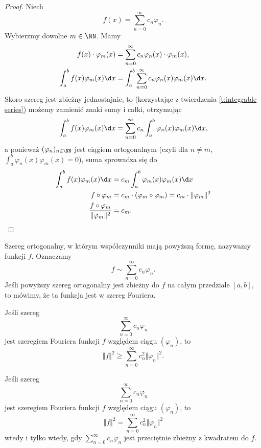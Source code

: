 \begin{proof}
    Niech
    \[ f(x) = \sum_{n=0}^\infty c_n\varphi_n. \]
    Wybierzmy dowolne $m \in \NN$. Mamy
    \begin{align*}
        f(x) \cdot \varphi_m (x)
        &= \sum_{n=0}^\infty c_n \varphi_n(x) \cdot \varphi_m(x), \\
        \int_a^b f(x) \varphi_m(x) \d x
        &= \int_a^b \sum_{n=0}^\infty c_n \varphi_n(x) \varphi_m(x) \d x.
    \end{align*}
    Skoro szereg jest zbieżny jednostajnie, to (korzystając z twierdzenia \ref{t:integrable series}) możemy zamienić znaki sumy i całki, otrzymując
    \[ \int_a^b f(x) \varphi_m(x) \d x = \sum_{n=0}^\infty c_n \int_a^b \varphi_n(x) \varphi_m(x) \d x, \]
    a ponieważ $(\varphi_n)_{n \in \NN}$ jest ciągiem ortogonalnym (czyli dla $n \neq m$, $\int_a^b \varphi_n(x) \varphi_m(x) = 0$), suma sprowadza się do
    \begin{align*}
        \int_a^b f(x) \varphi_m(x) \d x
        &= c_m \int_a^b \varphi_m(x) \varphi_m(x) \d x \\
        f \circ \varphi_m
        &= c_m \cdot (\varphi_m \circ \varphi_m)
        = c_m \cdot \Vert \varphi_m \Vert^2 \\
        \frac{f \circ \varphi_m}{\Vert \varphi_m \Vert^2}
        &= c_m.
    \end{align*}
\end{proof}

Szereg ortogonalny, w którym współczynniki mają powyższą formę, nazywamy  funkcji $f$. Oznaczamy
\[ f \sim \sum_{n=0}^\infty c_n\varphi_n. \]
Jeśli powyższy szereg ortogonalny jest zbieżny do $f$ na całym przedziale $[a, b]$, to mówimy, że ta funkcja jest  w szereg Fouriera.

\begin{theorem}
    Jeśli szereg
    \[ \sum_{n=0}^\infty c_n\varphi_n \]
    jest szeregiem Fouriera funkcji $f$ względem ciągu $(\varphi_n)$, to
    \[ \Vert f \Vert^2 \geq \sum_{n=0}^\infty c_n^2 \Vert \varphi_n \Vert^2. \]
\end{theorem}

\begin{theorem}
    \label{t:Parseval}
    Jeśli szereg
    \[ \sum_{n=0}^\infty c_n\varphi_n \]
    jest szeregiem Fouriera funkcji $f$ względem ciągu $(\varphi_n)$, to
    \[ \Vert f \Vert^2 = \sum_{n=0}^\infty c_n^2 \Vert \varphi_n \Vert^2 \]
    wtedy i tylko wtedy, gdy $\sum_{n=0}^\infty c_n\varphi_n$ jest przeciętnie zbieżny z kwadratem do $f$.
\end{theorem}

